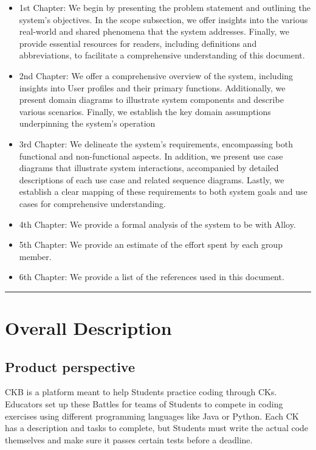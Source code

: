 \documentclass{Configuration_Files/Template}
\begin{document}
\begin{itemize}
\item \textcolor{bluepoli}{1st Chapter:} We begin by presenting the problem statement and outlining the system's objectives. In the scope subsection, we offer insights into the various real-world and shared phenomena that the system addresses. Finally, we provide essential resources for readers, including definitions and abbreviations, to facilitate a comprehensive understanding of this document.
\item \textcolor{bluepoli}{2nd Chapter:} We offer a comprehensive overview of the system, including insights into User profiles and their primary functions. Additionally, we present domain diagrams to illustrate system components and describe various scenarios. Finally, we establish the key domain assumptions underpinning the system's operation
\item \textcolor{bluepoli}{3rd Chapter:} We delineate the system's requirements, encompassing both functional and non-functional aspects. In addition, we present use case diagrams that illustrate system interactions, accompanied by detailed descriptions of each use case and related sequence diagrams. Lastly, we establish a clear mapping of these requirements to both system goals and use cases for comprehensive understanding.
\item \textcolor{bluepoli}{4th Chapter:} We provide a formal analysis of the system to be with Alloy.
\item \textcolor{bluepoli}{5th Chapter:} We provide an estimate of the effort spent by each group member.
\item \textcolor{bluepoli}{6th Chapter:} We provide a list of the references used in this document.
\end{itemize}

{\color{bluepoli}\rule{\linewidth}{0.1pt}}

\chapter{Overall Description}

\section{Product perspective}

CKB is a platform meant to help Students practice coding through CKs. Educators set up these Battles for teams of Students to compete in coding exercises using different programming languages like Java or Python. Each CK has a description and tasks to complete, but Students must write the actual code themselves and make sure it passes certain tests before a deadline.
\end{document}
